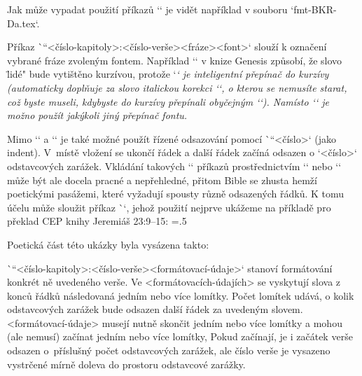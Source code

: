 Jak může vypadat použití příkazů `\fmt*` je vidět například v souboru
`fmt-BKR-Da.tex`.

Příkaz \`\fmtfont``{<číslo-kapitoly>:<číslo-verše>}{<fráze>}{<font>}`
slouží k označení vybrané fráze zvoleným fontem.
Například `` v knize Genesis způsobí, že slovo
\"lidé" bude vytištěno kurzívou, protože `\em` je inteligentní přepínač do kurzívy (automaticky doplňuje za slovo italickou korekci `\/`, o kterou se nemusíte starat, což byste museli, kdybyste do kurzívy přepínali obyčejným `\it`).
Namísto `\em` je možno použít jakýkoli jiný přepínač fontu.

Mimo `\begcenter` a `\endcenter` je také možné použít řízené odsazování pomocí
\`\ind``<číslo>` (jako indent). V~místě vložení se ukončí řádek a další řádek začíná
odsazen o `<číslo>` odstavcových zarážek. Vkládání takových `\ind` příkazů
prostřednictvím `\fmtins` nebo `\fmtpre` může být ale docela pracné a
nepřehledné, přitom Bible se zhusta hemží poetickými pasážemi, které vyžadují spousty
různě odsazených řádků. K tomu účelu může sloužit příkaz \`\fmtpoetry`, jehož
použití nejprve ukážeme na příkladě pro překlad CEP knihy Jeremiáš 23:9--15:
\medskip
\picw=.5\hsize
\centerline{ }
\vskip-2pt  %
\centerline{ }

Poetická část této ukázky byla vysázena takto:
\begtt
{}
\endtt

\`\fmtpoetry``{<číslo-kapitoly>:<číslo-verše>}{<formátovací-údaje>}` stanoví
formátování konkrét%
ně uvedeného verše. Ve <formátovacích-údajích> se
vyskytují slova z konců řádků následovaná jedním nebo více lomítky. Počet
lomítek udává, o kolik odstavcových zarážek bude odsazen další řádek za
uvedeným slovem. <formátovací-údaje> musejí nutně skončit jedním nebo více
lomítky a mohou (ale nemusí) začínat jedním nebo více lomítky, Pokud
začínají, je i začátek verše odsazen o~příslušný počet odstavcových zarážek,
ale číslo verše je vysazeno vystrčené mírně doleva do prostoru odstavcové
zarážky.

